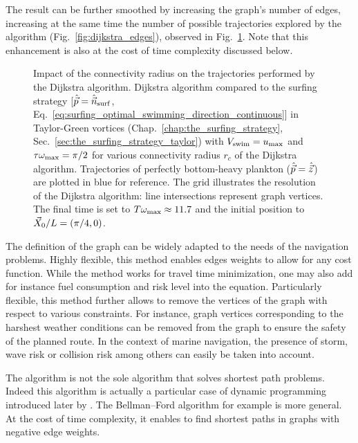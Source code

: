 The result can be further smoothed by increasing the graph's number of edges, increasing at the same time the number of possible trajectories explored by the algorithm (Fig.~\ref{fig:dijkstra_edges}), observed in Fig.~\ref{fig:taylor_green_vortex_dijkstra_connectivity}.
Note that this enhancement is also at the cost of time complexity discussed below.
\begin{figure}%
	\centering
	
	\caption[Impact of the connectivity radius on the trajectories performed by the Dijkstra algorithm.]{
		Impact of the connectivity radius on the trajectories performed by the Dijkstra algorithm.
		Dijkstra algorithm compared to the surfing strategy [$\hat{\vec{p}} = \hat{\vec{n}}_{\mathrm{surf}}$, Eq.~\eqref{eq:surfing_optimal_swimming_direction_continuous}] in Taylor-Green vortices (Chap.~\ref{chap:the_surfing_strategy}, Sec.~\ref{sec:the_surfing_strategy_taylor}) with $V_{\mathrm{swim}} = u_{\max}$ and $\tau \omega_{\max} = \pi/2$ for various connectivity radius $r_c$ of the Dijkstra algorithm.
		Trajectories of perfectly bottom-heavy plankton ($\hat{\vec{p}} = \hat{\vec{z}}$) are plotted in blue for reference.
		The grid illustrates the resolution of the Dijkstra algorithm: line intersections represent graph vertices.
		The  final time is set to $T \omega_{\max} \approx 11.7$ and the initial position to $\vec{X}_0/L = (\pi/4, 0)$.
	}
	\label{fig:taylor_green_vortex_dijkstra_connectivity}
\end{figure}

The definition of the graph can be widely adapted to the needs of the navigation problems. 
Highly flexible, this method enables edges weights to allow for any cost function.
While the method works for travel time minimization, one may also add for instance fuel consumption and risk level into the equation.
Particularly flexible, this method further allows to remove the vertices of the graph with respect to various constraints.
For instance, graph vertices corresponding to the harshest weather conditions can be removed from the graph to ensure the safety of the planned route.
In the context of marine navigation, the presence of storm, wave risk or collision risk among others can easily be taken into account.

The \citet{dijkstra1959note} algorithm is not the sole algorithm that solves shortest path problems.
Indeed this algorithm is actually a particular case of dynamic programming introduced later by \citet{bellman1966dynamic}.
The Bellman–Ford algorithm \citep{ford1956network, bellman1958routing} for example is more general.
At the cost of time complexity, it enables to find shortest paths in graphs with negative edge weights.

